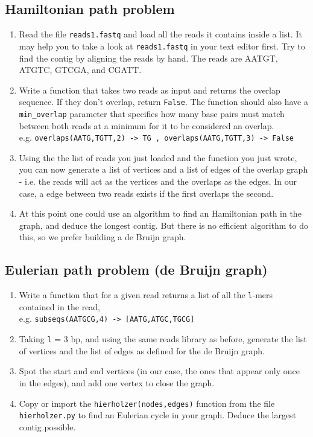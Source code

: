 \documentclass[a4paper,11pt]{article}
\begin{document}
\subsection{Hamiltonian path problem}
\begin{enumerate}
\item Read the file \texttt{reads1.fastq} and load all the reads it contains inside a list. It may help you to take a look at \texttt{reads1.fastq} in your text editor first. Try to find the contig by aligning the reads by hand. The reads are AATGT, ATGTC, GTCGA, and CGATT.
\item Write a function that takes two reads as input and returns the overlap sequence. If they don't overlap, return \texttt{False}. The function should also have a \texttt{min\_overlap} parameter that specifies how many base pairs must match between both reads at a minimum for it to be considered an overlap. \\
e.g. \texttt{overlaps(AATG,TGTT,2) -> TG , overlaps(AATG,TGTT,3) -> False}
\item Using the the list of reads you just loaded and the function you just wrote, you can now generate a list of vertices and a list of edges of the overlap graph - i.e. the reads will act as the vertices and the overlaps as the edges. In our case, a edge between two reads exists if the first overlaps the second.
\item At this point one could use an algorithm to find an Hamiltonian path in the graph, and deduce the longest contig. But there is no efficient algorithm to do this, so we prefer building a de Bruijn graph.
\end{enumerate}

\subsection{Eulerian path problem (de Bruijn graph)}
\begin{enumerate}
\item Write a function that for a given read returns a list of all the \texttt{l}-mers contained in the read, \\
e.g. \texttt{subseqs(AATGCG,4) ->  [AATG,ATGC,TGCG]}
\item Taking \texttt{l} = 3 bp, and using the same reads library as before, generate the list of vertices and the list of edges as defined for the de Bruijn graph.
\item Spot the start and end vertices (in our case, the ones that appear only once in the edges), and add one vertex to close the graph.
\item Copy or import the \texttt{hierholzer(nodes,edges)} function from the file \texttt{hierholzer.py} to find an Eulerian cycle in your graph. Deduce the largest contig possible.
\end{enumerate}
\end{document}
